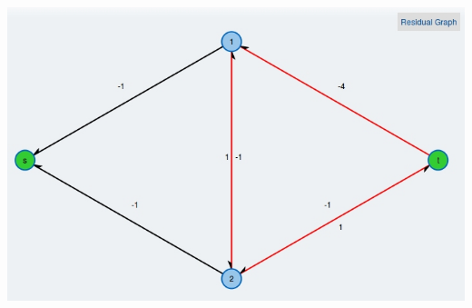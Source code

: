 \begin{center}
\begin{minipage}[t]{0.70\textwidth}
    \includegraphics[width=\textwidth]{img/cycle-canceling-3.jpg}
\end{minipage}
\end{center}
